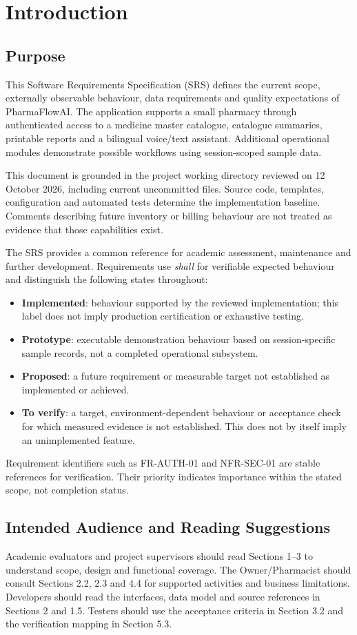 \documentclass{article}
\newcommand{\Project}{PharmaFlowAI}
\newcommand{\BaselineDate}{12 October 2026}
\newcommand{\Implemented}{\textbf{Implemented}}
\newcommand{\Prototype}{\textbf{Prototype}}
\newcommand{\Proposed}{\textbf{Proposed}}
\newcommand{\ToVerify}{\textbf{To verify}}
\begin{document}
\section{Introduction}
\subsection{Purpose}
This Software Requirements Specification (SRS) defines the current scope, externally observable behaviour, data requirements and quality expectations of \Project. The application supports a small pharmacy through authenticated access to a medicine master catalogue, catalogue summaries, printable reports and a bilingual voice/text assistant. Additional operational modules demonstrate possible workflows using session-scoped sample data.

This document is grounded in the project working directory reviewed on \BaselineDate, including current uncommitted files. Source code, templates, configuration and automated tests determine the implementation baseline. Comments describing future inventory or billing behaviour are not treated as evidence that those capabilities exist.

The SRS provides a common reference for academic assessment, maintenance and further development. Requirements use \emph{shall} for verifiable expected behaviour and distinguish the following states throughout:
\begin{itemize}
\item \Implemented: behaviour supported by the reviewed implementation; this label does not imply production certification or exhaustive testing.
\item \Prototype: executable demonstration behaviour based on session-specific sample records, not a completed operational subsystem.
\item \Proposed: a future requirement or measurable target not established as implemented or achieved.
\item \ToVerify: a target, environment-dependent behaviour or acceptance check for which measured evidence is not established. This does not by itself imply an unimplemented feature.
\end{itemize}
Requirement identifiers such as FR-AUTH-01 and NFR-SEC-01 are stable references for verification. Their priority indicates importance within the stated scope, not completion status.

\subsection{Intended Audience and Reading Suggestions}
Academic evaluators and project supervisors should read Sections 1--3 to understand scope, design and functional coverage. The Owner/Pharmacist should consult Sections 2.2, 2.3 and 4.4 for supported activities and business limitations. Developers should read the interfaces, data model and source references in Sections 2 and 1.5. Testers should use the acceptance criteria in Section 3.2 and the verification mapping in Section 5.3.
\end{document}
